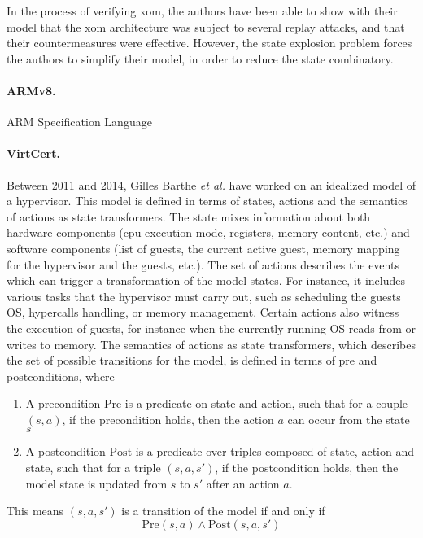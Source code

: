 %
In the process of verifying \ac{xom}, the authors have been able to show with
their model that the \ac{xom} architecture was subject to several replay
attacks, and that their countermeasures were effective.
%
However, the state explosion problem forces the authors to simplify their
model, in order to reduce the state combinatory.

\paragraph{ARMv8.}
%
ARM Specification Language
%

\paragraph{VirtCert.}
%
Between 2011 and 2014, Gilles Barthe \emph{et al.} have worked on an idealized
model of a hypervisor.
%
This model is defined in terms of states, actions and the semantics of actions
as state trans\-formers.
%
The state mixes information about both hardware components (\ac{cpu} execution
mode, registers, memory content, etc.) and software components (list of guests,
the current active guest, memory mapping for the hypervisor and the guests,
etc.).
%
The set of actions describes the events which can trigger a transformation of
the model states.
%
For instance, it includes various tasks that the hypervisor must carry out, such
as scheduling the guests OS, hypercalls handling, or memory management.
%
Certain actions also witness the execution of guests, for instance when the
currently running OS reads from or writes to memory.
%
The semantics of actions as state transformers, which describes the set of
possible transitions for the model, is defined in terms of pre and
postconditions, where
%
\begin{enumerate}
\item A precondition \( \mathrm{Pre} \) is a predicate on state and action, such
  that for a couple \( (s, a) \), if the precondition holds, then the action
  \( a \) can occur from the state \( s \)
\item A postcondition \( \mathrm{Post} \) is a predicate over triples composed
  of state, action and state, such that for a triple \( (s, a, s') \), if the
  postcondition holds, then the model state is updated from \( s \) to \( s' \)
  after an action \( a \).
\end{enumerate}
%
This means \( (s, a, s') \) is a transition of the model if and only if
%
\[
  \mathrm{Pre}(s, a) \wedge \mathrm{Post}(s, a, s')
\]

